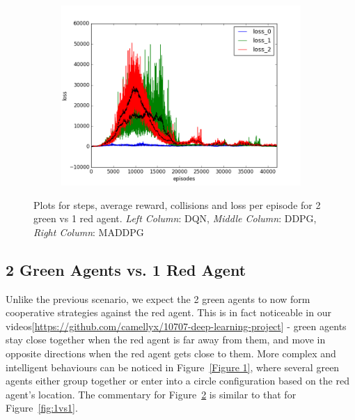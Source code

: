 \begin{figure}[t]
\begin{subfigure}[t]{\figscale\linewidth}
    \includegraphics[width=1.5\textwidth]
    {../results/maddpg_1vs2/loss.png}
    \label{fig:maddpg-1vs2-loss}
  \end{subfigure}

  \caption{Plots for steps, average reward, collisions and loss per episode for 2 green vs 1 red agent. \textit{Left Column}: DQN, \textit{Middle Column}: DDPG, \textit{Right Column}: MADDPG}
  \label{fig:1vs2}
\end{figure}
\FloatBarrier

\subsection{2 Green Agents vs. 1 Red Agent}
\label{sec:experiment:1vs2}

Unlike the previous scenario, we expect the 2 green agents to now form cooperative strategies against the red agent. This is in fact noticeable in our videos[\url{https://github.com/camellyx/10707-deep-learning-project}] - green agents stay close together when the red agent is far away from them, and move in opposite directions when the red agent gets close to them. More complex and intelligent behaviours can be noticed in Figure~\ref{Figure 1}, where several green agents either group together or enter into a circle configuration based on the red agent's location. The commentary for Figure~\ref{fig:1vs2} is similar to that for Figure~\ref{fig:1vs1}.

